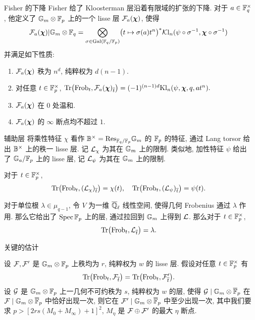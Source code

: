 \documentclass[aspectratio=169,handout]{ctexbeamer}
\newcommand\bchi{{\boldsymbol\chi}}
\begin{document}
\begin{frame}{Fisher 的下降}
Fisher 给了 Kloosterman 层沿着有限域的扩张的下降.
对于 $a\in{\mathbb{F}}_q^\times$, 他定义了 $\mathbb{G}_m\otimes{\mathbb{F}}_p$ 上的一个 lisse 层 $\CF_a(\bchi)$, 使得
\[\CF_a(\bchi)|\Gm\otimes\BF_q=\bigotimes\limits_{\sigma\in\Gal(\BF_q/\BF_p)} \bigl(t\mapsto \sigma(a)t^n\bigr)^*\CKl_n(\psi\circ\sigma^{-1},\bchi\circ\sigma^{-1})\]
并满足如下性质:
\begin{enumerate}
\item $\CF_a(\bchi)$ 秩为 $n^d$, 纯粹权为 $d(n-1)$.
\item 对任意 $t\in{\mathbb{F}}_p^\times$,
	$\Tr\bigl(\Frob_t,\CF_a(\bchi)_{\ov t}\bigr)=(-1)^{(n-1)d}\Kl_n(\psi,\bchi,q,at^n).$
\item $\CF_a(\bchi)$ 在 $0$ 处温和.
\item $\CF_a(\bchi)$ 的 $\infty$ 断点均不超过 $1$.
\end{enumerate}
\end{frame}



\begin{frame}{辅助层}
将乘性特征 $\chi$ 看作 ${\mathbb{B}}^\times={\mathrm{Res}}_{{\mathbb{F}}_q/{\mathbb{F}}_p}\mathbb{G}_m$ 的 ${\mathbb{F}}_p$ 的特征, 通过 Lang torsor 给出 ${\mathbb{B}}^\times$ 上的秩一 lisse 层. 记 ${\mathcal{L}}_\chi$ 为其在 $\mathbb{G}_m$ 上的限制.
类似地, 加性特征 $\psi$ 给出了 $\mathbb{G}_a/{\mathbb{F}}_p$ 上的 lisse 层, 记 ${\mathcal{L}}_\psi$ 为其在 $\mathbb{G}_m$ 上的限制.

对于 $t\in{\mathbb{F}}_p^\times$,
\[{\mathrm{Tr}}\bigl({\mathrm{Frob}}_t, ({\mathcal{L}}_\chi)_{\overline t}\bigr)=\chi(t),\quad
{\mathrm{Tr}}\bigl({\mathrm{Frob}}_t, ({\mathcal{L}}_\psi)_{\overline t}\bigr)=\psi(t).\]

对于单位根 $\lambda\in\mu_{q-1}$, 令 $V$ 为一维 $\overline{{\mathbb{Q}}}_\ell$ 线性空间, 使得几何 Frobenius 通过 $\lambda$ 作用.
那么它给出了 $\operatorname{Spec} {\mathbb{F}}_p$ 上的层, 通过拉回到 $\mathbb{G}_m$ 上得到 ${\mathcal{L}}$.
那么对于 $t\in{\mathbb{F}}_p^\times$,
\[{\mathrm{Tr}}\bigl({\mathrm{Frob}}_t, {\mathcal{L}}_{\overline t}\bigr)=\lambda.\]
\end{frame}

\begin{frame}{关键的估计}
\begin{lemma}
设 ${\mathcal{F}},{\mathcal{F}}'$ 是 $\mathbb{G}_m\otimes{\mathbb{F}}_p$ 上秩均为 $r$, 纯粹权为 $w$ 的 lisse 层.
假设对任意 $t\in {\mathbb{F}}_p^\times$ 有
	\[{\mathrm{Tr}}\bigl({\mathrm{Frob}}_t, {\mathcal{F}}_{\overline t}\bigr)={\mathrm{Tr}}\bigl({\mathrm{Frob}}_t, {\mathcal{F}}'_{\overline t}\bigr).\]
设 ${\mathcal{G}}$ 是 $\mathbb{G}_m\otimes{\mathbb{F}}_p$ 上一几何不可约秩为 $s$, 纯粹权为 $w$ 的层, 使得 ${\mathcal{G}}\mid \mathbb{G}_m\otimes\overline{{\mathbb{F}}}_p$ 在 ${\mathcal{F}}\mid \mathbb{G}_m\otimes\overline {{\mathbb{F}}}_p$ 中恰好出现一次, 则它在 ${\mathcal{F}}'\mid \mathbb{G}_m\otimes\overline {{\mathbb{F}}}_p$ 中至少出现一次, 其中我们要求 $p>[2rs(M_0+M_\infty)+1]^2$, $M_\eta$ 是 ${\mathcal{F}}\oplus {\mathcal{F}}'$ 的最大 $\eta$ 断点.
\end{lemma}
\end{frame}
\end{document}
